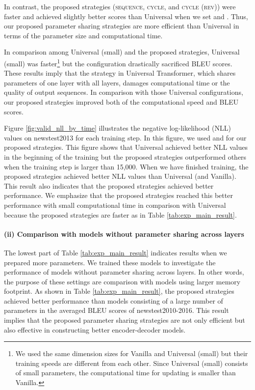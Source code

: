 \documentclass[11pt]{article}
\begin{document}
In contrast, the proposed strategies (\textsc{sequence}, \textsc{cycle}, and \textsc{cycle (rev)}) were faster and achieved slightly better scores than Universal when we set  and .
Thus, our proposed parameter sharing strategies are more efficient than Universal in terms of the parameter size and computational time.

In comparison among Universal (small) and the proposed strategies, Universal (small) was faster\footnote{We used the same dimension sizes for Vanilla and Universal (small) but their training speeds are different from each other. Since Universal (small) consists of small parameters, the computational time for updating is smaller than Vanilla.} but the configuration drastically sacrificed BLEU scores.
These results imply that the strategy in Universal Transformer, which shares parameters of one layer with all layers, damages computational time or the quality of output sequences.
In comparison with those Universal configurations, our proposed strategies improved both of the computational speed and BLEU scores.

Figure \ref{fig:valid_nll_by_time} illustrates the negative log-likelihood (NLL) values on newstest2013 for each training step.
In this figure, we used  and  for our proposed strategies.
This figure shows that Universal achieved better NLL values in the beginning of the training but the proposed strategies outperformed others when the training step is larger than 15,000.
When we have finished training, the proposed strategies achieved better NLL values than Universal (and Vanilla).
This result also indicates that the proposed strategies achieved better performance.
We emphasize that the proposed strategies reached this better performance with small computational time in comparison with Universal because the proposed strategies are faster as in Table \ref{tab:exp_main_result}.




\paragraph{(ii) Comparison with models without parameter sharing across layers}
The lowest part of Table \ref{tab:exp_main_result} indicates results when we prepared more parameters.
We trained these models to investigate the performance of models without parameter sharing across layers.
In other words, the purpose of these settings are comparison with models using larger memory footprint.
As shown in Table \ref{tab:exp_main_result}, the proposed strategies achieved better performance than models consisting of a large number of parameters in the averaged BLEU scores of newstest2010-2016.
This result implies that the proposed parameter sharing strategies are not only efficient but also effective in constructing better encoder-decoder models.
\end{document}
